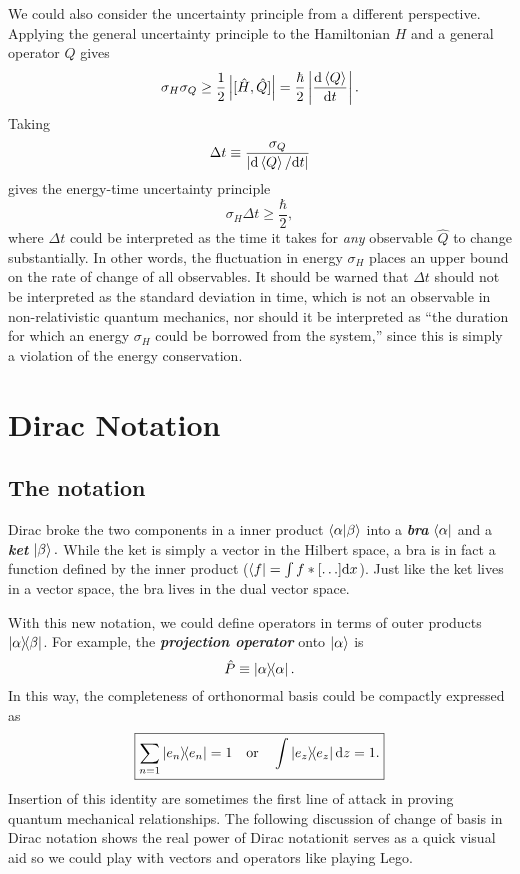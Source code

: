 \documentclass{article}
\theoremstyle{nonumberplain}
\begin{document}
We could also consider the uncertainty principle from a different perspective. Applying the general uncertainty principle to the Hamiltonian $H$ and a general operator $Q$ gives 
\[
    \sigma _H \sigma _Q \geq \frac{1}{2} \left\vert [\hat{H} ,\hat{Q} ] \right\vert 
    = \frac{\hbar}{2} \left\vert \frac{\mathrm{d}\expval{Q}}{\mathrm{d}t}  \right\vert. 
\]
Taking 
\[
    \Delta t \equiv \frac{\sigma _Q}{\left\vert \mathrm{d}\expval{Q}/{\mathrm{d}t}  \right\vert }
\]
gives the energy-time uncertainty principle 
\begin{equation} \label{eq:energy-time-uncertainty}
    \sigma _H \Delta t \geq  \frac{\hbar}{2},
\end{equation}
where $\Delta t$ could be interpreted as the time it takes for \textit{any} observable $\hat{Q} $ to change substantially. In other words, the fluctuation in energy $\sigma_H$ places an upper bound on the rate of change of all observables. It should be warned that $\Delta t$ should not be interpreted as the standard deviation in time, which is not an observable in non-relativistic quantum mechanics, nor should it be interpreted as ``the duration for which an energy $\sigma _H$ could be borrowed from the system,'' since this is simply a violation of the energy conservation.  

\section{Dirac Notation}
\subsection{The notation}
Dirac broke the two components in a inner product $\braket{\alpha }{\beta }$ into a \textit{\textbf{bra}} $\bra{\alpha }$ and a \textit{\textbf{ket}} $\ket{\beta }. $ While the ket is simply a vector in the Hilbert space, a bra is in fact a function defined by the inner product ($\bra{f} = \int f* [\ldots ] \mathrm{d} x $). Just like the ket lives in a vector space, the bra lives in the dual vector space. 

With this new notation, we could define operators in terms of outer products $\dyad{\alpha }{\beta }$. For example, the \textit{\textbf{projection operator}} onto $\ket{\alpha }$ is 
\[
    \hat{P} \equiv \dyad{\alpha }. 
\] 
In this way, the completeness of orthonormal basis could be compactly expressed as 
\begin{equation}
    \boxed{
        \sum\limits_{n=1} \dyad{e_n} = 1 
        \quad \text{or} \quad 
        \int \dyad{e_z} \mathrm{d}z = 1.
    }
\end{equation}
Insertion of this identity are sometimes the first line of attack in proving quantum mechanical relationships. The following discussion of change of basis in Dirac notation shows the real power of Dirac notation\textemdash it serves as a quick visual aid so we could play with vectors and operators like playing Lego. 
\end{document}

